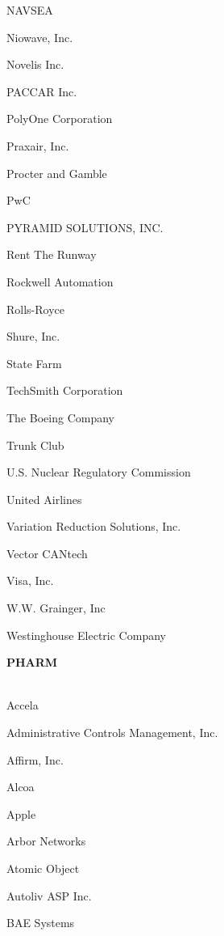 \documentclass[twoside]{article}
\begin{document}
\begin{center}
\begin{multicols}{5}
\begin{FlushLeft}
\begin{compactitem}
\item NAVSEA
\item Niowave, Inc.
\item Novelis Inc.
\item PACCAR Inc.
\item PolyOne Corporation
\item Praxair, Inc.
\item Procter and Gamble
\item PwC
\item PYRAMID SOLUTIONS, INC.
\item Rent The Runway
\item Rockwell Automation
\item Rolls-Royce
\item Shure, Inc.
\item State Farm
\item TechSmith Corporation
\item The Boeing Company
\item Trunk Club
\item U.S. Nuclear Regulatory Commission
\item United Airlines
\item Variation Reduction Solutions, Inc.
\item Vector CANtech
\item Visa, Inc.
\item W.W. Grainger, Inc
\item Westinghouse Electric Company
\end{compactitem}
        \end{FlushLeft}
        \vspace{1em}
        {\fontsize{14}{16}\selectfont \bf PHARM}\\
        \vspace{-1em}
        ~\hrulefill~
        \vspace{-.9em}
        \begin{FlushLeft}
        \begin{compactitem}
        \item Accela
\item Administrative Controls Management, Inc.
\item Affirm, Inc.
\item Alcoa
\item Apple
\item Arbor Networks
\item Atomic Object
\item Autoliv ASP Inc.
\item BAE Systems

\end{compactitem}
\end{FlushLeft}
\end{multicols}
\end{center}
\end{document}
